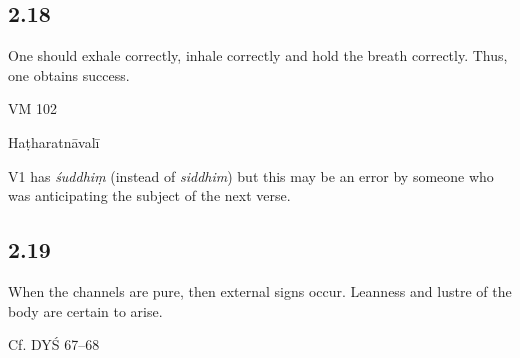 \begin{ekdosis}
\begin{philcomm}[hp02_017]
\end{philcomm}


\subsection*{2.18}
\begin{translation}[hp02_018]
One should exhale correctly, inhale correctly and hold the breath correctly. Thus, one obtains success.
\end{translation}

\begin{sources}[hp02_018]
VM 102

\begin{versinnote}
\end{versinnote}
\end{sources}

\begin{testimonia}[hp02_018]
Haṭharatnāvalī

\begin{versinnote}
\end{versinnote}
\end{testimonia}

\begin{philcomm}[hp02_018]
V1 has \emph{śuddhiṃ} (instead of \emph{siddhim}) but this may be an error by someone who was anticipating the subject of the next verse.

\end{philcomm}

\subsection*{2.19}
\begin{translation}[hp02_019]
When the channels are pure, then external signs occur. Leanness and lustre of the body are certain to arise.
\end{translation}

\begin{sources}[hp02_019]
Cf.  DYŚ 67--68


\end{sources}
\end{ekdosis}
